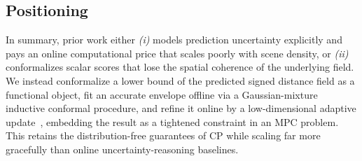 \documentclass[lettersize,journal]{IEEEtran}
\begin{document}
\subsection{Positioning}
In summary, prior work either \textit{(i)} models prediction uncertainty explicitly and pays an online computational price that scales poorly with scene density, or \textit{(ii)} conformalizes scalar scores that lose the spatial coherence of the underlying field. We instead conformalize a lower bound of the predicted signed distance field as a functional object, fit an accurate envelope offline via a Gaussian-mixture inductive conformal procedure, and refine it online by a low-dimensional adaptive update~\cite{gibbs2021adaptive}, embedding the result as a tightened constraint in an MPC problem. This retains the distribution-free guarantees of CP while scaling far more gracefully than online uncertainty-reasoning baselines.






            


\end{document}
